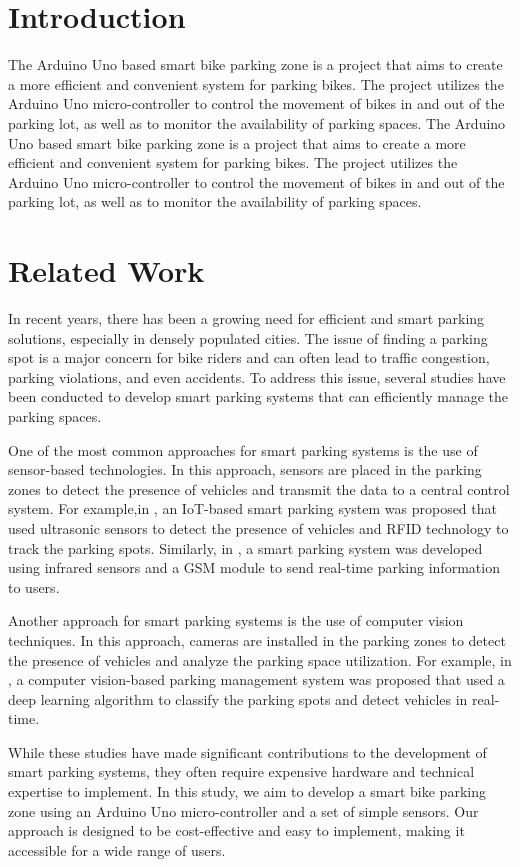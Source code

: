 \documentclass[conference]{IEEEtran}
\begin{document}
	\section{Introduction}

	The Arduino Uno based smart bike parking zone is a project that aims to create a more efficient and convenient system for parking bikes. The project utilizes the Arduino Uno micro-controller to control the movement of bikes in and out of the parking lot, as well as to monitor the availability of parking spaces. 
	The Arduino Uno based smart bike parking zone is a project that aims to create a more efficient and convenient system for parking bikes. The project utilizes the Arduino Uno micro-controller to control the movement of bikes in and out of the parking lot, as well as to monitor the availability of parking spaces. 
	\section{Related Work}
	In recent years, there has been a growing need for efficient and smart parking solutions, especially in densely populated cities. The issue of finding a parking spot is a major concern for bike riders and can often lead to traffic congestion, parking violations, and even accidents. To address this issue, several studies have been conducted to develop smart parking systems that can efficiently manage the parking spaces.
	
	One of the most common approaches for smart parking systems is the use of sensor-based technologies. In this approach, sensors are placed in the parking zones to detect the presence of vehicles and transmit the data to a central control system. For example,in \cite{b1}, an IoT-based smart parking system was proposed that used ultrasonic sensors to detect the presence of vehicles and RFID technology to track the parking spots. Similarly, in \cite{b2}, a smart parking system was developed using infrared sensors and a GSM module to send real-time parking information to users.
	
	Another approach for smart parking systems is the use of computer vision techniques. In this approach, cameras are installed in the parking zones to detect the presence of vehicles and analyze the parking space utilization. For example, in \cite{b3}, a computer vision-based parking management system was proposed that used a deep learning algorithm to classify the parking spots and detect vehicles in real-time.
	
	While these studies have made significant contributions to the development of smart parking systems, they often require expensive hardware and technical expertise to implement. In this study, we aim to develop a smart bike parking zone using an Arduino Uno micro-controller and a set of simple sensors. Our approach is designed to be cost-effective and easy to implement, making it accessible for a wide range of users.
	
\end{document}
